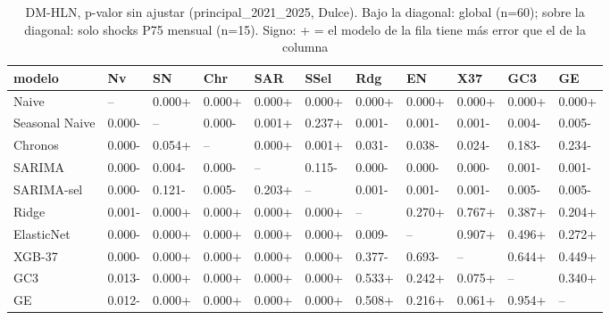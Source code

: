 \begin{table}[H]
\centering
\small
\caption{DM-HLN, p-valor sin ajustar (principal\_2021\_2025, Dulce). Bajo la diagonal: global (n=60); sobre la diagonal: solo shocks P75 mensual (n=15). Signo: + = el modelo de la fila tiene más error que el de la columna}
\label{tab:T09_DM_matriz_principal_2021_2025_dulce}
\begin{tabular}{lllllllllll}
\toprule
modelo & Nv & SN & Chr & SAR & SSel & Rdg & EN & X37 & GC3 & GE \\
\midrule
Naive & -- & 0.000+ & 0.000+ & 0.000+ & 0.000+ & 0.000+ & 0.000+ & 0.000+ & 0.000+ & 0.000+ \\
Seasonal Naive & 0.000- & -- & 0.000- & 0.001+ & 0.237+ & 0.001- & 0.001- & 0.001- & 0.004- & 0.005- \\
Chronos & 0.000- & 0.054+ & -- & 0.000+ & 0.001+ & 0.031- & 0.038- & 0.024- & 0.183- & 0.234- \\
SARIMA & 0.000- & 0.004- & 0.000- & -- & 0.115- & 0.000- & 0.000- & 0.000- & 0.001- & 0.001- \\
SARIMA-sel & 0.000- & 0.121- & 0.005- & 0.203+ & -- & 0.001- & 0.001- & 0.001- & 0.005- & 0.005- \\
Ridge & 0.001- & 0.000+ & 0.000+ & 0.000+ & 0.000+ & -- & 0.270+ & 0.767+ & 0.387+ & 0.204+ \\
ElasticNet & 0.000- & 0.000+ & 0.000+ & 0.000+ & 0.000+ & 0.009- & -- & 0.907+ & 0.496+ & 0.272+ \\
XGB-37 & 0.000- & 0.000+ & 0.000+ & 0.000+ & 0.000+ & 0.377- & 0.693- & -- & 0.644+ & 0.449+ \\
GC3 & 0.013- & 0.000+ & 0.000+ & 0.000+ & 0.000+ & 0.533+ & 0.242+ & 0.075+ & -- & 0.340+ \\
GE & 0.012- & 0.000+ & 0.000+ & 0.000+ & 0.000+ & 0.508+ & 0.216+ & 0.061+ & 0.954+ & -- \\
\bottomrule
\end{tabular}
\end{table}